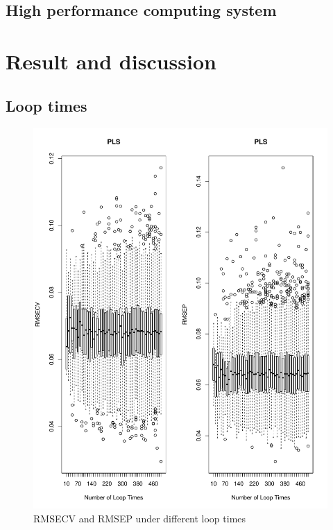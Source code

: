 \documentclass[a4paper,12pt,titlepage]{article} %
\numberwithin{equation}{section}  %
\begin{document}
	\subsection{High performance computing system}
	\label{myriad}
	
	
	\section{Result and discussion}
	\label{sec:result}
	
	\subsection{Loop times}
	\label{sec:Loop times}
	\begin{figure}[h]    %
		\centering           %
		\includegraphics[width=15.5cm, angle=0]{no_loop_time500.pdf}  %
		\vspace*{-0.25cm}    %
		\caption{RMSECV and RMSEP under different loop times}          %
		\label{fig:looptimes}               %
	\end{figure}                        %
\end{document}
